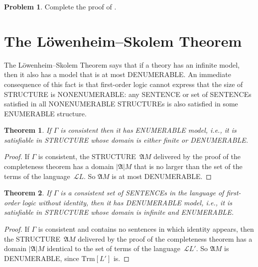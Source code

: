 \documentclass[10pt,a4paper]{article}
\makeatletter
\newcommand*{\olup}[1]{\MakeUppercase{#1}}
\theoremstyle{plain}
\newtheorem{thm}{Theorem}[section]
\theoremstyle{definition}
\newtheorem{prob}{Problem}[section]
\theoremstyle{remark}
\newcommand*{\olfileid}[3]{}
\newcommand*{\olsection}[1]{\section*{#1}}
\newcommand*{\ollabel}[1]{\label{#1}}
\newcommand{\olref}{\@ifnextchar[{\olref@i}{\olref@final}}
\def\olref@i[#1]{\@ifnextchar[{\olref@ii}{\olref@final}}
\def\olref@ii[#1]{\@ifnextchar[{\olref@iii}{\olref@final}}
\def\olref@iii[#1]{\olref@final}
\def\olref@final#1{\ref{#1}}
\providecommand{\Struct}{\ensuremath{\mathfrak{A}}}
\providecommand{\Domain}{\ensuremath{|\mathfrak{A}|}}
\providecommand{\Lang}{\ensuremath{\mathcal{L}}}
\providecommand{\Trm}{\mathrm{Trm}}
\makeatother
\begin{document}
\begin{prob}
Complete the proof of \olref[pl][com][mod]{lem:truth}.
\end{prob}

\tagendprob





\olfileid{fol}{com}{dls}
\olsection{The L\"owenheim--Skolem Theorem}

The L\"owenheim--Skolem Theorem says that if a theory has an infinite
model, then it also has a model that is at most \olup{denumerable}. An
immediate consequence of this fact is that first-order logic cannot
express that the size of \olup{structure} is \olup{nonenumerable}: any
\olup{sentence} or set of \olup{sentence}s satisfied in all
\olup{nonenumerable} \olup{structure}s is also satisfied in some
\olup{enumerable} structure.

\begin{thm} 
\ollabel{thm:downward-ls} If $\Gamma$ is consistent then it has
\olup{enumerable} model, i.e., it is satisfiable in \olup{structure}
whose domain is either finite or \olup{denumerable}.
\end{thm}

\begin{proof}
If $\Gamma$ is consistent, the \olup{structure}~$\Struct M$ delivered by
the proof of the completeness theorem has a domain $\Domain{M}$ that
is no larger than the set of the terms of the language~$\Lang L$. So
$\Struct M$ is at most \olup{denumerable}.
\end{proof}

\begin{thm}
\ollabel{noidentity-ls} If $\Gamma$ is a consistent set of \olup{sentence}s
in the language of first-order logic without identity, then it has
\olup{denumerable} model, i.e., it is satisfiable in \olup{structure}
whose domain is infinite and \olup{enumerable}.
\end{thm}

\begin{proof}
If $\Gamma$ is consistent and contains no sentences in which identity
appears, then the \olup{structure}~$\Struct M$ delivered by the proof of
the completeness theorem has a domain $\Domain{M}$ identical to the set
of terms of the language~$\Lang L'$. So $\Struct{M}$ is
\olup{denumerable}, since $\Trm[L']$ is.
\end{proof}
\end{document}
